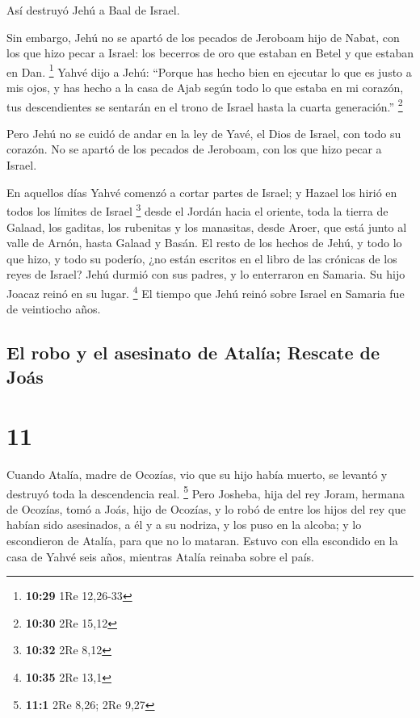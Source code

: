  Así destruyó Jehú a Baal de Israel.

 Sin embargo, Jehú no se apartó de los pecados de
Jeroboam hijo de Nabat, con los que hizo pecar a Israel: los becerros de
oro que estaban en Betel y que estaban en Dan. \footnote{\textbf{10:29}
  1Re 12,26-33}  Yahvé dijo a Jehú: ``Porque has hecho
bien en ejecutar lo que es justo a mis ojos, y has hecho a la casa de
Ajab según todo lo que estaba en mi corazón, tus descendientes se
sentarán en el trono de Israel hasta la cuarta generación.'' \footnote{\textbf{10:30}
  2Re 15,12}

 Pero Jehú no se cuidó de andar en la ley de Yavé, el
Dios de Israel, con todo su corazón. No se apartó de los pecados de
Jeroboam, con los que hizo pecar a Israel.

 En aquellos días Yahvé comenzó a cortar partes de
Israel; y Hazael los hirió en todos los límites de Israel \footnote{\textbf{10:32}
  2Re 8,12}  desde el Jordán hacia el oriente, toda la
tierra de Galaad, los gaditas, los rubenitas y los manasitas, desde
Aroer, que está junto al valle de Arnón, hasta Galaad y Basán.
 El resto de los hechos de Jehú, y todo lo que hizo, y
todo su poderío, ¿no están escritos en el libro de las crónicas de los
reyes de Israel?  Jehú durmió con sus padres, y lo
enterraron en Samaria. Su hijo Joacaz reinó en su lugar. \footnote{\textbf{10:35}
  2Re 13,1}  El tiempo que Jehú reinó sobre Israel en
Samaria fue de veintiocho años.

\hypertarget{el-robo-y-el-asesinato-de-ataluxeda-rescate-de-jouxe1s}{%
\subsection{El robo y el asesinato de Atalía; Rescate de
Joás}\label{el-robo-y-el-asesinato-de-ataluxeda-rescate-de-jouxe1s}}

\hypertarget{section-10}{%
\section{11}\label{section-10}}

 Cuando Atalía, madre de Ocozías, vio que su hijo había
muerto, se levantó y destruyó toda la descendencia real. \footnote{\textbf{11:1}
  2Re 8,26; 2Re 9,27}  Pero Josheba, hija del rey Joram,
hermana de Ocozías, tomó a Joás, hijo de Ocozías, y lo robó de entre los
hijos del rey que habían sido asesinados, a él y a su nodriza, y los
puso en la alcoba; y lo escondieron de Atalía, para que no lo mataran.
 Estuvo con ella escondido en la casa de Yahvé seis años,
mientras Atalía reinaba sobre el país.

